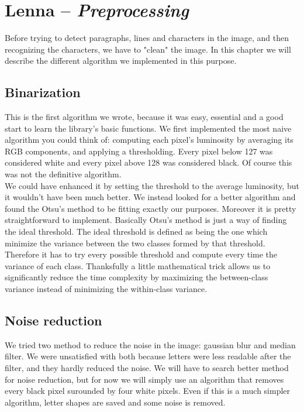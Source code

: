 \documentclass[12pt]{report}
\begin{document}
\chapter{Lenna -- \emph{Preprocessing}}

Before trying to detect paragraphs, lines and characters in the image, and then recognizing the characters, we have to "clean" the image. In this chapter we will describe the different algorithm we implemented in this purpose.

\section{Binarization}
This is the first algorithm we wrote, because it was easy, essential and a good
start to learn the library's basic functions. We first implemented the most
naive algorithm you could think of: computing each pixel's luminosity by
averaging its RGB components, and applying a thresholding. Every pixel below 127
was considered white and every pixel above 128 was considered black.
Of course this was not the definitive algorithm.\\

We could have enhanced it by setting the threshold to the average luminosity,
but it wouldn't have been much better. We instead looked for a better algorithm
and found the Otsu's method to be fitting exactly our purposes. Moreover it is
pretty straightforward to implement. Basically Otsu's method is just a way of
finding the ideal threshold. The ideal threshold is defined as being the one
which minimize the variance between the two classes formed by that threshold.
Therefore it has to try every possible threshold and compute every time the
variance of each class. Thanksfully a little mathematical trick allows us to
significantly reduce the time complexity by maximizing the between-class
variance instead of minimizing the within-class variance.\\

\section{Noise reduction}

We tried two method to reduce the noise in the image: gaussian blur and median
filter. We were unsatisfied with both because letters were less readable after
the filter, and they hardly reduced the noise. We will have to search better
method for noise reduction, but for now we will simply use an algorithm that
removes every black pixel surounded by four white pixels. Even if this is a much
simpler algorithm, letter shapes are saved and some noise is removed.
\end{document}
